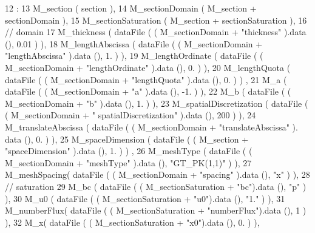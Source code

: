 \begin{DoxyCode}
12                                                                  :
13                              M\_section ( section ),
14                              M\_sectionDomain ( M\_section + sectionDomain ),
15                              M\_sectionSaturation ( M\_section + sectionSaturation ),
16                              \textcolor{comment}{// domain}
17                              M\_thickness ( dataFile ( ( M\_sectionDomain + \textcolor{stringliteral}{"thickness"} ).data (), 0.01 ) ),
18                              M\_lengthAbscissa ( dataFile ( ( M\_sectionDomain + \textcolor{stringliteral}{"lengthAbscissa"} ).data (), 
      1. ) ),
19                              M\_lengthOrdinate ( dataFile ( ( M\_sectionDomain + \textcolor{stringliteral}{"lengthOrdinate"} ).data (), 
      0. ) ),
20                              M\_lengthQuota ( dataFile ( ( M\_sectionDomain + \textcolor{stringliteral}{"lengthQuota"} ).data (), 0. ) )
      ,
21                              M\_a ( dataFile ( ( M\_sectionDomain + \textcolor{stringliteral}{"a"} ).data (), -1. ) ),
22                              M\_b ( dataFile ( ( M\_sectionDomain + \textcolor{stringliteral}{"b"} ).data (), 1. ) ),
23                              M\_spatialDiscretization ( dataFile ( ( M\_sectionDomain + \textcolor{stringliteral}{"
      spatialDiscretization"} ).data (), 200 ) ),
24                              M\_translateAbscissa ( dataFile ( ( M\_sectionDomain + \textcolor{stringliteral}{"translateAbscissa"} ).
      data (), 0. ) ),
25                              M\_spaceDimension ( dataFile ( ( M\_section + \textcolor{stringliteral}{"spaceDimension"} ).data (), 1. ) )
      ,
26                              M\_meshType ( dataFile ( ( M\_sectionDomain + \textcolor{stringliteral}{"meshType"} ).data (), \textcolor{stringliteral}{"GT\_PK(1,1)"}
       ) ),
27                              M\_meshSpacing( dataFile ( ( M\_sectionDomain + \textcolor{stringliteral}{"spacing"} ).data (), \textcolor{stringliteral}{"x"} ) ),
28                              \textcolor{comment}{// saturation}
29                              M\_bc ( dataFile ( ( M\_sectionSaturation + \textcolor{stringliteral}{"bc"}).data (), \textcolor{stringliteral}{"p"} ) ),
30                              M\_u0 ( dataFile ( ( M\_sectionSaturation + \textcolor{stringliteral}{"u0"}).data (), \textcolor{stringliteral}{"1."} ) ),
31                              M\_numberFlux( dataFile ( ( M\_sectionSaturation + \textcolor{stringliteral}{"numberFlux"}).data (), 1 ) ),
32                              M\_x( dataFile ( ( M\_sectionSaturation + \textcolor{stringliteral}{"x0"}).data (), 0. ) ),

\end{DoxyCode}
